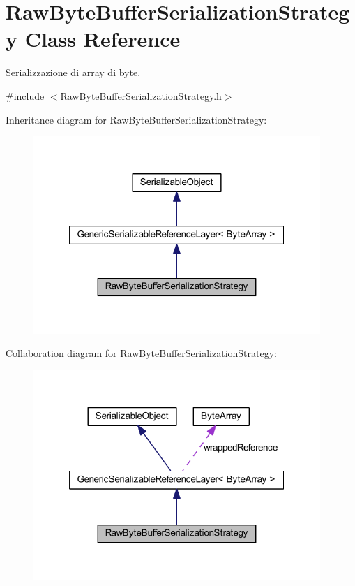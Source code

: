 \hypertarget{class_raw_byte_buffer_serialization_strategy}{
\section{RawByteBufferSerializationStrategy Class Reference}
\label{class_raw_byte_buffer_serialization_strategy}
}


Serializzazione di array di byte.  




{\ttfamily \#include $<$RawByteBufferSerializationStrategy.h$>$}



Inheritance diagram for RawByteBufferSerializationStrategy:\nopagebreak
\begin{figure}[H]
\begin{center}
\leavevmode
\includegraphics[width=308pt]{class_raw_byte_buffer_serialization_strategy__inherit__graph}
\end{center}
\end{figure}


Collaboration diagram for RawByteBufferSerializationStrategy:\nopagebreak
\begin{figure}[H]
\begin{center}
\leavevmode
\includegraphics[width=308pt]{class_raw_byte_buffer_serialization_strategy__coll__graph}
\end{center}
\end{figure}
